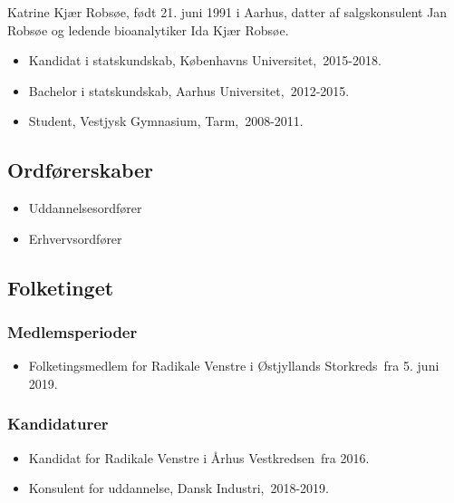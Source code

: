 \documentclass[11pt, a4paper]{awesome-cv}
\begin{document}
\makecvheader[R]
\makelettertitle
\begin{cvletter}
Katrine Kjær Robsøe, født 21. juni 1991 i Aarhus, datter af salgskonsulent Jan Robsøe og ledende bioanalytiker Ida Kjær Robsøe.

\begin{itemize}
\item Kandidat i statskundskab, Københavns Universitet, 2015-2018.
\item Bachelor i statskundskab, Aarhus Universitet, 2012-2015.
\item Student, Vestjysk Gymnasium, Tarm, 2008-2011.
\end{itemize}
\subsection*{Ordførerskaber}
\begin{itemize}
\item Uddannelsesordfører
\item Erhvervsordfører
\end{itemize}
\subsection*{Folketinget}
\subsubsection*{Medlemsperioder}
\begin{itemize}
\item Folketingsmedlem for Radikale Venstre i Østjyllands Storkreds fra 5. juni 2019.
\end{itemize}
\subsubsection*{Kandidaturer}
\begin{itemize}
\item Kandidat for Radikale Venstre i Århus Vestkredsen fra 2016.
\end{itemize}
\begin{itemize}
\item Konsulent for uddannelse, Dansk Industri, 2018-2019.
\end{itemize}
\end{cvletter}
\end{document}
